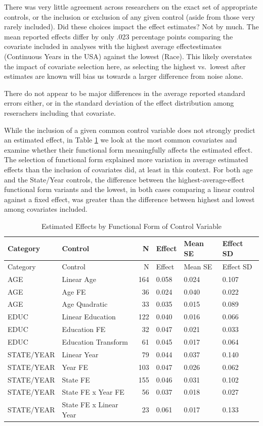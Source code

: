 \documentclass[
  letterpaper,
  DIV=11,
  numbers=noendperiod]{scrartcl}
\begin{document}
There was very little agreement across researchers on the exact set of
appropriate controls, or the inclusion or exclusion of any given control
(aside from those very rarely included). Did these choices impact the
effect estimates? Not by much. The mean reported effects differ by only
.023 percentage points comparing the covariate included in analyses with
the highest average effectestimates (Continuous Years in the USA)
against the lowest (Race). This likely overstates the impact of
covariate selection here, as selecting the highest vs.~lowest after
estimates are known will bias us towards a larger difference from noise
alone.

There do not appear to be major differences in the average reported
standard errors either, or in the standard deviation of the effect
distribution among reserachers including that covariate.

While the inclusion of a given common control variable does not strongly
predict an estimated effect, in Table
\ref{tab-effects-by-functional-form} we look at the most common
covariates and examine whether their functional form meaningfully
affects the estimated effect. The selection of functional form explained
more variation in average estimated effects than the inclusion of
covariates did, at least in this context. For both age and the
State/Year controls, the difference between the highest-average-effect
functional form variants and the lowest, in both cases comparing a
linear control against a fixed effect, was greater than the difference
between highest and lowest among covariates included.

\begin{longtable}[]{@{}llrlll@{}}
\caption{Estimated Effects by Functional Form of Control Variable
\label{tab-effects-by-functional-form}}\tabularnewline
\toprule\noalign{}
Category & Control & N & Effect & Mean SE & Effect SD \\
\midrule\noalign{}
\endfirsthead
\toprule\noalign{}
Category & Control & N & Effect & Mean SE & Effect SD \\
\midrule\noalign{}
\endhead
\bottomrule\noalign{}
\endlastfoot
AGE & Linear Age & 164 & 0.058 & 0.024 & 0.107 \\
AGE & Age FE & 36 & 0.024 & 0.040 & 0.022 \\
AGE & Age Quadratic & 33 & 0.035 & 0.015 & 0.089 \\
EDUC & Linear Education & 122 & 0.040 & 0.016 & 0.066 \\
EDUC & Education FE & 32 & 0.047 & 0.021 & 0.033 \\
EDUC & Education Transform & 61 & 0.045 & 0.017 & 0.064 \\
STATE/YEAR & Linear Year & 79 & 0.044 & 0.037 & 0.140 \\
STATE/YEAR & Year FE & 103 & 0.047 & 0.026 & 0.062 \\
STATE/YEAR & State FE & 155 & 0.046 & 0.031 & 0.102 \\
STATE/YEAR & State FE x Year FE & 56 & 0.037 & 0.018 & 0.027 \\
STATE/YEAR & State FE x Linear Year & 23 & 0.061 & 0.017 & 0.133 \\
\end{longtable}
\end{document}
